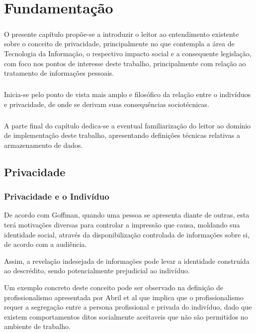 \chapter{Fundamentação}
\label{cap2}

\paragraph{} O presente capítulo propõe-se a introduzir o leitor ao entendimento existente sobre o conceito de privacidade, principalmente no que contempla a área de Tecnologia da Informação, o respectivo impacto social e a consequente legislação, com foco nos pontos de interesse deste trabalho,
principalmente com relação ao tratamento de informações pessoais.
\paragraph{} Inicia-se pelo ponto de vista mais amplo e filosófico da relação entre o indivíduos e privacidade, de onde se derivam suas consequências sociotécnicas.
\paragraph{} A parte final do capítulo dedica-se a eventual familiarização do leitor ao domínio de implementação deste trabalho, apresentando definições técnicas relativas a armazenamento de dados.

\section{Privacidade}

\subsection{Privacidade e o Indivíduo}

De acordo com Goffman\cite{goffman1978presentation}, quando uma pessoa se apresenta diante de outras, esta terá motivações diversas para controlar a impressão que causa, moldando sua identidade social, através da disponibilização controlada de informações sobre si, de acordo com a audiência. 

Assim, a revelação indesejada de informações pode levar a identidade construída ao descrédito, sendo potencialmente prejudicial ao indivíduo.

Um exemplo concreto deste conceito pode ser observado na definição de profissionalismo apresentada por Abril et al \cite{sanchez2012blurred} que implica que o profissionalismo requer a segregação entre a persona profissional e privada do indivíduo, dado que existem comportamentos ditos socialmente aceitaveis que não são permitidos no ambiente de trabalho.

